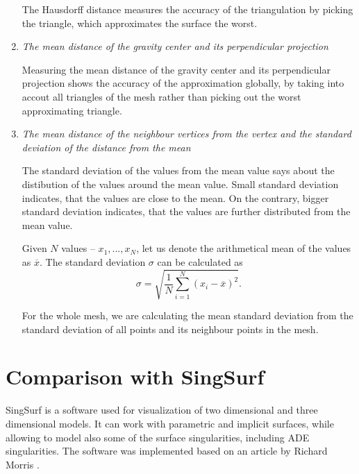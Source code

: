 \begin{enumerate}
    The Hausdorff distance measures the accuracy of the triangulation by picking the 
    triangle, which approximates the surface the worst.

    \item \textit{The mean distance of the gravity center and its perpendicular projection}
    
    Measuring the mean distance of the gravity center and its perpendicular 
    projection shows the accuracy of the approximation globally, by taking into
    accout all triangles of the mesh rather than picking out the worst approximating 
    triangle.

    \item \textit{The mean distance of the neighbour vertices from the vertex and the 
    standard deviation of the distance from the mean}

    The standard deviation of the values from the mean value says about the 
    distibution of the values around the mean value. Small standard deviation indicates,
    that the values are close to the mean. On the contrary, bigger standard deviation
    indicates, that the values are further distributed from the mean value.

    \begin{definition}
        Given $N$ values -- $x_1, ..., x_N$, let us denote the arithmetical mean 
        of the values as $\overline{x}$. The standard deviation $\sigma$ can be calculated
        as
        \begin{equation}
            \sigma = \sqrt{\frac{1}{N} \sum\limits_{i=1}^{N}(x_i - \overline{x})^2}. 
        \end{equation}
    \end{definition}

    For the whole mesh, we are calculating the mean standard deviation from the 
    standard deviation of all points and its neighbour points in the mesh.
\end{enumerate}

\section{Comparison with SingSurf}
\label{sub4.2}

SingSurf \cite{singsurf} is a software used for visualization of two dimensional
and three dimensional models. It can work with parametric and implicit surfaces, 
while allowing to model also some of the surface singularities, including
ADE singularities. The software was implemented based on an article by 
Richard Morris \cite{morris2003client}.

